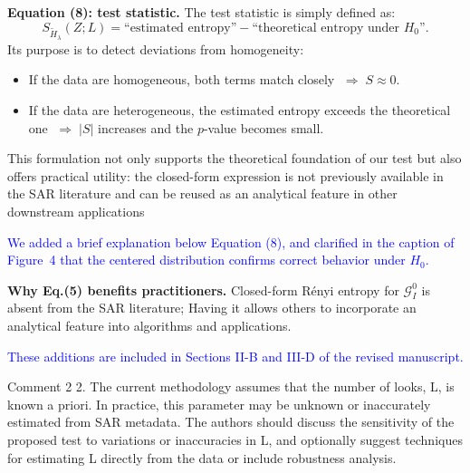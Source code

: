 \documentclass[11pt]{report}
\begin{document}
\begin{responsebox}{}
\vspace{0.5em}
\textbf{Equation (8): test statistic.}  
The test statistic is simply defined as:
\[
S_{\widetilde H_\lambda}(Z;L)
= \text{“estimated entropy”} - \text{“theoretical entropy under } H_0\text{”}.
\]
Its purpose is to detect deviations from homogeneity:
\begin{itemize}
	\item  If the data are homogeneous, both terms match closely $\;\Rightarrow\;S\approx0$.
	\item  If the data are heterogeneous, the estimated entropy exceeds the theoretical one $\;\Rightarrow\;|S|$ increases and the $p$-value becomes small.
\end{itemize}

 This formulation not only supports the theoretical foundation of our test but also offers practical utility: the closed-form expression is not previously available in the SAR literature and can be reused as an analytical feature in other downstream applications

\vspace{0.3em}
\textcolor{blue}{We added a brief explanation below Equation (8), and clarified in the caption of Figure~4 that the centered distribution confirms correct behavior under $H_0$.}


\textbf{Why Eq.(5) benefits practitioners.}  
Closed-form Rényi entropy for $\mathcal{G}^{0}_{\!I}$ is absent from the SAR literature; Having it allows others to incorporate an analytical feature into algorithms and applications.

\textcolor{blue}{These additions are included in Sections II-B and III-D of the revised manuscript.}
\end{responsebox}


\vspace{5em}
\begin{reviewbox}{Comment 2}
2. The current methodology assumes that the number of looks, L, is known a priori. In practice, this parameter may be unknown or inaccurately estimated from SAR metadata. The authors should discuss the sensitivity of the proposed test to variations or inaccuracies in L, and optionally suggest techniques for estimating L directly from the data or include robustness analysis. 
\end{reviewbox}
\end{document}
